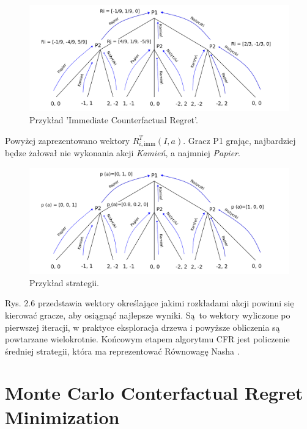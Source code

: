 \documentclass[12pt,oneside,a4paper]{report}
\begin{document}
\begin{figure}[th!]
            \center
           \includegraphics[width=1\textwidth]{./img/drawing3.pdf}
           \caption{Przykład 'Immediate Counterfactual Regret'.}
\end{figure}

\vspace{0.5cm}
\vspace{10cm}

Powyżej zaprezentowano wektory $R^{T}_{i,\text{imm}} (I, a)$.
Gracz P1 grając, najbardziej będze żałował nie wykonania akcji \emph{Kamień}, a najmniej
\emph{Papier}.

\vspace{0.5cm}
\begin{figure}[th!]
            \center
           \includegraphics[width=1\textwidth]{./img/drawing4.pdf}
           \caption{Przykład strategii.}
\end{figure}
 
Rys. 2.6 przedstawia wektory określające jakimi rozkładami akcji powinni się kierować gracze, aby
osiągnąć najlepsze wyniki. Są to wektory wyliczone po pierwszej iteracji, w praktyce eksploracja
drzewa i powyższe obliczenia są powtarzane wielokrotnie. Końcowym etapem algorytmu CFR jest
policzenie średniej strategii, która ma reprezentować Równowagę Nasha \cite{CFR}.





\section{Monte Carlo Conterfactual Regret Minimization}
\end{document}
